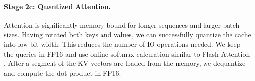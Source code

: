 \paragraph{Stage 2c: Quantized Attention.}
Attention is significantly memory bound for longer sequences and larger batch sizes. Having rotated both keys and values, we can successfully quantize the cache into low bit-width. This reduces the number of IO operations needed. We keep the queries in FP16 and use online softmax calculation similar to Flash Attention \citep{flash-attention}. After a segment of the KV vectors are loaded from the memory, we dequantize and compute the dot product in FP16.





